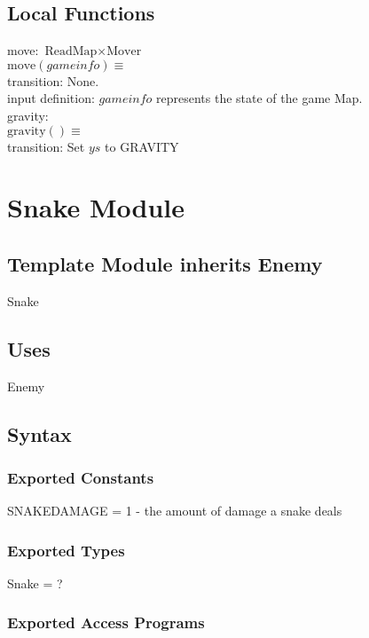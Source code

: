 \documentclass[12pt]{article}
\newcommand{\m}[1]{\mbox{#1}}
\begin{document}
\subsection*{Local Functions}

\noindent move: $\m{ReadMap} \times \m{Mover}$\\
$\m{move}(gameinfo) \equiv$\\
transition: None.\\
input definition: $gameinfo$ represents the state of the game Map.\\

\noindent gravity:\\
$\m{gravity}() \equiv$\\
transition: Set $ys$ to GRAVITY\\

\newpage

\section*{Snake Module}

\subsection*{Template Module inherits Enemy}

Snake

\subsection*{Uses}

Enemy

\subsection*{Syntax}

\subsubsection*{Exported Constants}

SNAKEDAMAGE = 1 - the amount of damage a snake deals

\subsubsection*{Exported Types}

Snake = ?

\subsubsection*{Exported Access Programs}
\end{document}
